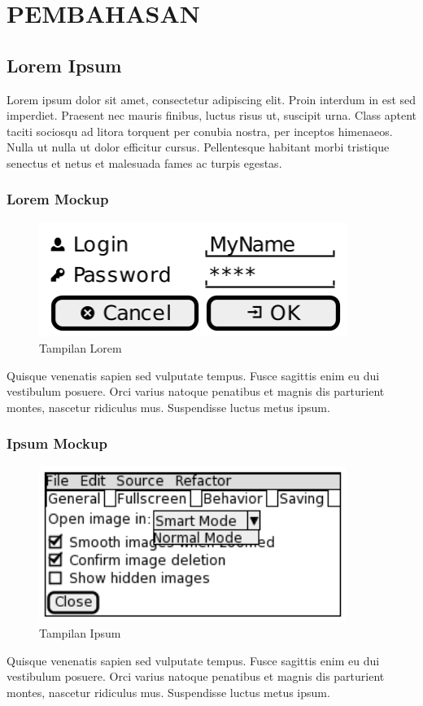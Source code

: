 \chapter{PEMBAHASAN}

\section{Lorem Ipsum}

Lorem ipsum dolor sit amet, consectetur adipiscing elit. Proin interdum in est sed imperdiet. Praesent nec mauris finibus, luctus risus ut, suscipit urna. Class aptent taciti sociosqu ad litora torquent per conubia nostra, per inceptos himenaeos. Nulla ut nulla ut dolor efficitur cursus. Pellentesque habitant morbi tristique senectus et netus et malesuada fames ac turpis egestas.

\subsection{Lorem Mockup}
\begin{figure}[H]
    \centering
    \includegraphics[width=10cm]{assets/pics/dummy-mockup1.png}
    \caption{Tampilan Lorem}
    \label{fig:loremMockup}
\end{figure}

Quisque venenatis sapien sed vulputate tempus. Fusce sagittis enim eu dui vestibulum posuere. Orci varius natoque penatibus et magnis dis parturient montes, nascetur ridiculus mus. Suspendisse luctus metus ipsum.

\subsection{Ipsum Mockup}
\begin{figure}[H]
    \centering
    \includegraphics[width=10cm]{assets/pics/dummy-mockup2.png}
    \caption{Tampilan Ipsum}
    \label{fig:ipsumMockup}
\end{figure}

Quisque venenatis sapien sed vulputate tempus. Fusce sagittis enim eu dui vestibulum posuere. Orci varius natoque penatibus et magnis dis parturient montes, nascetur ridiculus mus. Suspendisse luctus metus ipsum.